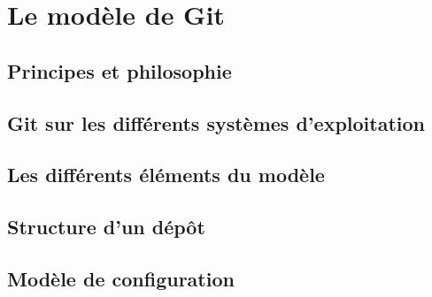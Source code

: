 \section{Le modèle de Git} %


\subsection{Principes et philosophie} %


\subsection{Git sur les différents systèmes d'exploitation}\label{GitOS} %

\subsection{Les différents éléments du modèle} %



\subsection{Structure d'un dépôt} %

\subsection{Modèle de configuration} %

